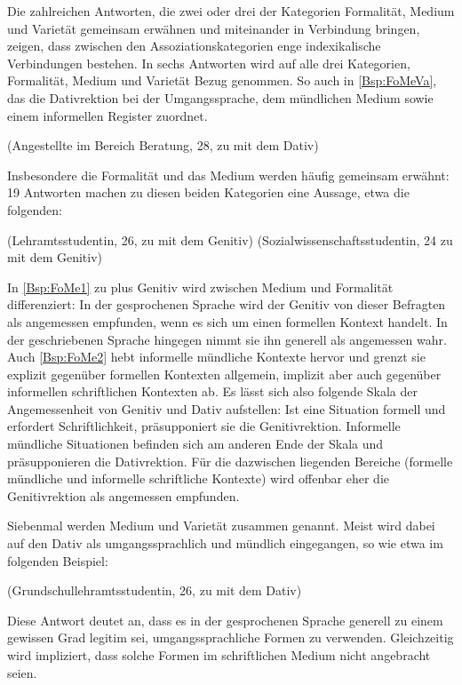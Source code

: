 Die zahlreichen Antworten, die zwei oder drei der Kategorien \glqq Formalität\grqq, \glqq Medium\grqq{} und \glqq Varietät\grqq{} gemeinsam erwähnen und miteinander in Verbindung bringen, zeigen, dass zwischen den Assoziationskategorien enge indexikalische Verbindungen bestehen. 
In sechs Antworten wird auf alle drei Kategorien, \glqq Formalität\grqq, \glqq Medium\grqq{} und \glqq Varietät\grqq{} Bezug genommen. 
So auch in \autoref{Bsp:FoMeVa}, das die Dativrektion bei \waehrend{} der Umgangssprache, dem mündlichen Medium sowie einem informellen Register zuordnet. 
\begin{exe}
\ex {} (Angestellte im Bereich Beratung, 28, zu \waehrend{} mit dem Dativ) \label{Bsp:FoMeVa}
\end{exe}
Insbesondere die Formalität und das Medium werden häufig gemeinsam erwähnt: 19 Antworten machen zu diesen beiden Kategorien eine Aussage, etwa die folgenden:  
\begin{exe}
\ex {} (Lehramtsstudentin, 26, zu \wegen{} mit dem Genitiv) \label{Bsp:FoMe1}
\ex {} (Sozialwissenschaftsstudentin, 24 zu \dank{} mit dem Genitiv) \label{Bsp:FoMe2}
\end{exe}
In \autoref{Bsp:FoMe1} zu \wegen{} plus Genitiv wird zwischen Medium und Formalität differenziert: 
In der gesprochenen Sprache wird der Genitiv von dieser Befragten als angemessen empfunden, wenn es sich um einen formellen Kontext handelt. 
In der geschriebenen Sprache hingegen nimmt sie ihn generell als angemessen wahr. 
Auch \autoref{Bsp:FoMe2} hebt informelle mündliche Kontexte hervor und grenzt sie explizit gegenüber formellen Kontexten allgemein, implizit aber auch gegenüber informellen schriftlichen Kontexten ab. 
Es lässt sich also folgende Skala der Angemessenheit von Genitiv und Dativ aufstellen:
Ist eine Situation formell und erfordert Schriftlichkeit, präsupponiert sie die Genitivrektion. 
Informelle mündliche Situationen befinden sich am anderen Ende der Skala und präsupponieren die Dativrektion. 
Für die dazwischen liegenden Bereiche (formelle mündliche und informelle schriftliche Kontexte) wird offenbar eher die Genitivrektion als angemessen empfunden. 

Siebenmal werden Medium und Varietät zusammen genannt. 
Meist wird dabei auf den Dativ als umgangssprachlich und mündlich eingegangen, so wie etwa im folgenden Beispiel:  
\begin{exe}
\ex {} (Grundschullehramtsstudentin, 26, zu \wegen{} mit dem Dativ)
\end{exe}
Diese Antwort deutet an, dass es in der gesprochenen Sprache generell zu einem gewissen Grad legitim sei, umgangssprachliche Formen zu verwenden. 
Gleichzeitig wird impliziert, dass solche Formen im schriftlichen Medium nicht angebracht seien.  

